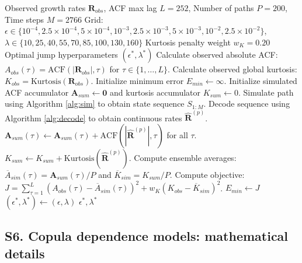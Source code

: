 \clearpage

\begin{algorithm}[tp]
\caption{Multi-objective grid search for jump hyperparameters}
\label{alg:grid_search}
\small
\begin{algorithmic}[1]
\REQUIRE Observed growth rates $\mathbf{R}_{obs}$, ACF max lag $L=252$, Number of paths $P=200$, Time steps $M=2766$
\REQUIRE Grid: $\epsilon \in \{10^{-4}, 2.5\times10^{-4}, 5\times10^{-4}, 10^{-3}, 2.5\times10^{-3}, 5\times10^{-3}, 10^{-2}, 2.5\times10^{-2}\}$, $\lambda \in \{10, 25, 40, 55, 70, 85, 100, 130, 160\}$
\REQUIRE Kurtosis penalty weight $w_K = 0.20$
\ENSURE Optimal jump hyperparameters $(\epsilon^*, \lambda^*)$
\STATE Calculate observed absolute ACF: $A_{obs}(\tau) = \text{ACF}(|\mathbf{R}_{obs}|, \tau)$ for $\tau \in \{1, \dots, L\}$.
\STATE Calculate observed global kurtosis: $K_{obs} = \text{Kurtosis}(\mathbf{R}_{obs})$.
\STATE Initialize minimum error $E_{min} \leftarrow \infty$.
        \STATE Initialize simulated ACF accumulator $\mathbf{A}_{sum} \leftarrow \mathbf{0}$ and kurtosis accumulator $K_{sum} \leftarrow 0$.
            \STATE Simulate path using Algorithm \ref{alg:sim} to obtain state sequence $S_{1:M}$.
            \STATE Decode sequence using Algorithm \ref{alg:decode} to obtain continuous rates $\mathbf{\hat{R}}^{(p)}$.
            \STATE $\mathbf{A}_{sum}(\tau) \leftarrow \mathbf{A}_{sum}(\tau) + \text{ACF}(|\mathbf{\hat{R}}^{(p)}|, \tau)$ for all $\tau$.
            \STATE $K_{sum} \leftarrow K_{sum} + \text{Kurtosis}(\mathbf{\hat{R}}^{(p)})$.
        \ENDFOR
        \STATE Compute ensemble averages: $\overline{A}_{sim}(\tau) = \mathbf{A}_{sum}(\tau) / P$ and $\overline{K}_{sim} = K_{sum} / P$.
        \STATE Compute objective: $J = \sum_{\tau=1}^L \left(A_{obs}(\tau) - \overline{A}_{sim}(\tau)\right)^2 + w_K \left(K_{obs} - \overline{K}_{sim}\right)^2$.
            \STATE $E_{min} \leftarrow J$
            \STATE $(\epsilon^*, \lambda^*) \leftarrow (\epsilon, \lambda)$
        \ENDIF
    \ENDFOR
\ENDFOR
\RETURN $\epsilon^*, \lambda^*$
\end{algorithmic}
\end{algorithm}

\clearpage

\subsection*{S6. Copula dependence models: mathematical details}
\label{sec:copula_math}

